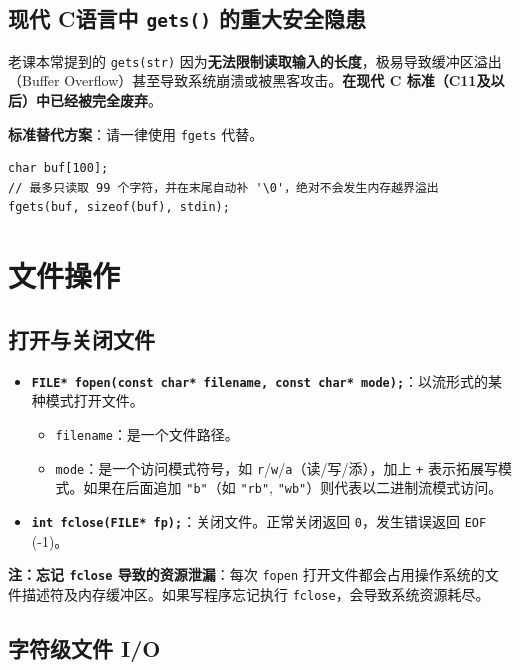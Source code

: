 \subsection{\texorpdfstring{现代 C语言中 \texttt{gets()} 的重大安全隐患}{gets() 的安全隐患}}

老课本常提到的 \texttt{gets(str)} 因为\textbf{无法限制读取输入的长度}，极易导致缓冲区溢出（Buffer Overflow）甚至导致系统崩溃或被黑客攻击。\textbf{在现代 C 标准（C11及以后）中已经被完全废弃}。

\textbf{标准替代方案}：请一律使用 \texttt{fgets} 代替。

\begin{lstlisting}[caption={安全的字符串读取}]
char buf[100];
// 最多只读取 99 个字符，并在末尾自动补 '\0'，绝对不会发生内存越界溢出
fgets(buf, sizeof(buf), stdin); 
\end{lstlisting}

\section{文件操作}

\subsection{打开与关闭文件}

\begin{itemize}
    \item \textbf{\texttt{FILE* fopen(const char* filename, const char* mode);}}：以流形式的某种模式打开文件。
    \begin{itemize}
        \item \texttt{filename}：是一个文件路径。
        \item \texttt{mode}：是一个访问模式符号，如 \texttt{r}/\texttt{w}/\texttt{a}（读/写/添），加上 \texttt{+} 表示拓展写模式。如果在后面追加 \texttt{"b"}（如 \texttt{"rb"}, \texttt{"wb"}）则代表以二进制流模式访问。
    \end{itemize}
    \item \textbf{\texttt{int fclose(FILE* fp);}}：关闭文件。正常关闭返回 \texttt{0}，发生错误返回 \texttt{EOF} (-1)。
\end{itemize}

\textbf{注：忘记 \texttt{fclose} 导致的资源泄漏}：每次 \texttt{fopen} 打开文件都会占用操作系统的文件描述符及内存缓冲区。如果写程序忘记执行 \texttt{fclose}，会导致系统资源耗尽。

\subsection{字符级文件 I/O}

